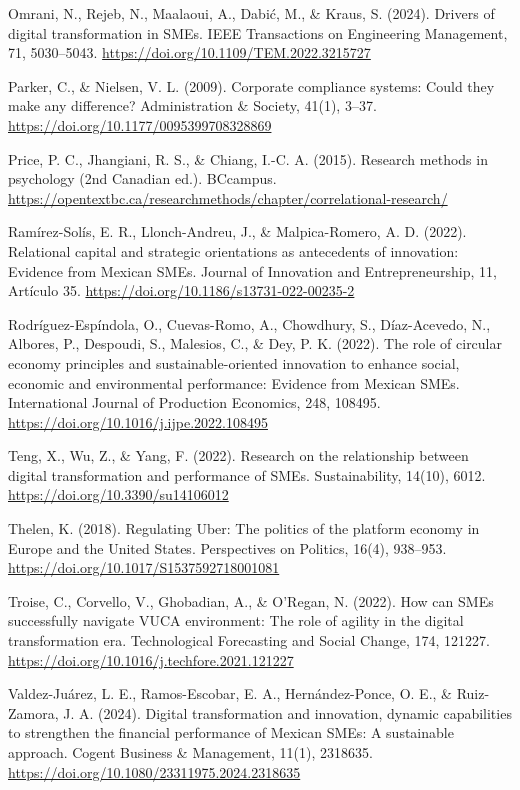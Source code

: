 {Omrani, N., Rejeb, N., Maalaoui, A., Dabić, M., \& Kraus, S. (2024). Drivers of digital transformation in SMEs. IEEE Transactions on Engineering Management, 71, 5030–5043. \url{https://doi.org/10.1109/TEM.2022.3215727}


Parker, C., \& Nielsen, V. L. (2009). Corporate compliance systems: Could they make any difference? Administration \& Society, 41(1), 3–37. \url{https://doi.org/10.1177/0095399708328869}


Price, P. C., Jhangiani, R. S., \& Chiang, I.-C. A. (2015). Research methods in psychology (2nd Canadian ed.). BCcampus. \url{https://opentextbc.ca/researchmethods/chapter/correlational-research/}


Ramírez-Solís, E. R., Llonch-Andreu, J., \& Malpica-Romero, A. D. (2022). Relational capital and strategic orientations as antecedents of innovation: Evidence from Mexican SMEs. Journal of Innovation and Entrepreneurship, 11, Artículo 35. \url{https://doi.org/10.1186/s13731-022-00235-2}


Rodríguez-Espíndola, O., Cuevas-Romo, A., Chowdhury, S., Díaz-Acevedo, N., Albores, P., Despoudi, S., Malesios, C., \& Dey, P. K. (2022). The role of circular economy principles and sustainable-oriented innovation to enhance social, economic and environmental performance: Evidence from Mexican SMEs. International Journal of Production Economics, 248, 108495. \url{https://doi.org/10.1016/j.ijpe.2022.108495}


Teng, X., Wu, Z., \& Yang, F. (2022). Research on the relationship between digital transformation and performance of SMEs. Sustainability, 14(10), 6012. \url{https://doi.org/10.3390/su14106012}


Thelen, K. (2018). Regulating Uber: The politics of the platform economy in Europe and the United States. Perspectives on Politics, 16(4), 938–953. \url{https://doi.org/10.1017/S1537592718001081}


Troise, C., Corvello, V., Ghobadian, A., \& O'Regan, N. (2022). How can SMEs successfully navigate VUCA environment: The role of agility in the digital transformation era. Technological Forecasting and Social Change, 174, 121227. \url{https://doi.org/10.1016/j.techfore.2021.121227}


Valdez-Juárez, L. E., Ramos-Escobar, E. A., Hernández-Ponce, O. E., \& Ruiz-Zamora, J. A. (2024). Digital transformation and innovation, dynamic capabilities to strengthen the financial performance of Mexican SMEs: A sustainable approach. Cogent Business \& Management, 11(1), 2318635. \url{https://doi.org/10.1080/23311975.2024.2318635}


}
